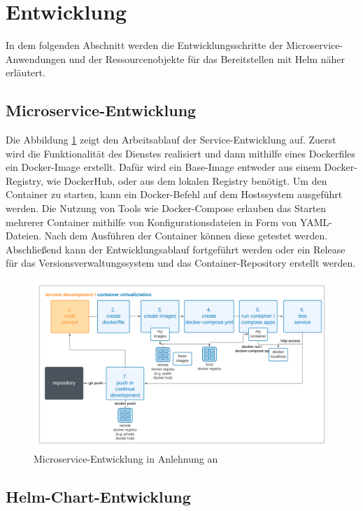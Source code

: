 \section{Entwicklung}
In dem folgenden Abschnitt werden die Entwicklungsschritte der Microservice-Anwen\-dungen und der Ressourcenobjekte für das Bereitstellen mit Helm näher erläutert.


\subsection{Microservice-Entwicklung}
Die Abbildung \ref{fig:DevWorkflowDocker} zeigt den Arbeitsablauf der Service-Entwicklung auf.
Zuerst wird die Funktionalität des Dienstes realisiert und dann mithilfe eines Dockerfiles ein Docker-Image erstellt.
Dafür wird ein Base-Image entweder aus einem Docker-Registry, wie DockerHub, oder aus dem lokalen Registry benötigt.
Um den Container zu starten, kann ein Docker-Befehl auf dem Hostssystem ausgeführt werden.
Die Nutzung von Tools wie Docker-Compose erlauben das Starten mehrerer Container mithilfe von Konfigurationsdateien in Form von YAML-Dateien.
Nach dem Ausführen der Container können diese getestet werden.
Abschließend kann der Entwicklungsablauf fortgeführt werden oder ein Release für das Versionsverwaltungssystem und das Container-Repository erstellt werden.


\begin{figure}[!htb]
    \centering
    \includegraphics[width=1.0\columnwidth]{images/DevWorkflowDocker.png}
    \caption{Microservice-Entwicklung in Anlehnung an \cite{dockerappsworkflow}}
    \label{fig:DevWorkflowDocker}
\end{figure}


\subsection{Helm-Chart-Entwicklung}

